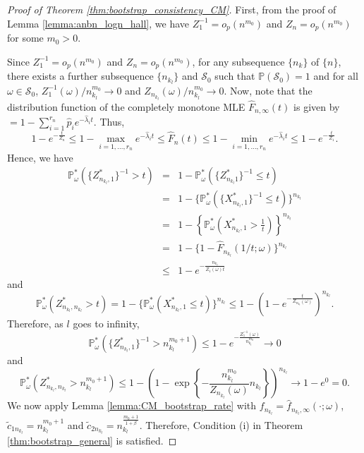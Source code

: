 \documentclass[12pt,letterpaper, twoside, openany]{article}
\theoremstyle{plain}
\begin{document}
\begin{proof}[Proof of Theorem \ref{thm:bootstrap_consistency_CM}]
First, from the proof of Lemma \ref{lemma:anbn_logn_hall}, we have $Z_1^{-1} = o_p(n^{m_0})$ and $Z_n = o_p(n^{m_0})$ for some $m_0 > 0$.

Since $Z^{-1}_1 = o_p(n^{m_0})$ and $Z_n = o_p(n^{m_0})$, for any subsequence $\{n_k\}$ of $\{n\}$, there exists a further subsequence $\{n_{k_l}\}$ and $\mathcal{S}_0$ such that $\mathbb{P}(\mathcal{S}_0) = 1$ and for all $\omega \in \mathcal{S}_0$, $Z^{-1}_1(\omega)/n^{m_0}_{k_l} \rightarrow 0$ and $Z_{n_{k_l}}(\omega)/n^{m_0}_{k_l} \rightarrow 0$. Now, note that the distribution function of the completely monotone MLE $\hat{F}_{n,\infty}(t)$ is given by $ = 1 - \sum^{r_n}_{i=1} \hat{p}_i e^{-\hat{\lambda}_i t}$. Thus,
\begin{equation*}
	1 - e^{-\frac{t}{Z_n}} \leq 1 - \max_{i=1,\ldots,r_n} e^{-\hat{\lambda}_i t} \leq \hat{F}_n(t) \leq 1 -  \min_{i=1,\ldots,r_n} e^{-\hat{\lambda}_i t} \leq 1 - e^{-\frac{t}{Z_1}}.
\end{equation*}
Hence, we have
\begin{eqnarray*}
	\mathbb{P}^*_{\omega}( \{Z^*_{n_{k_l},1}\}^{-1} > t) &=& 1 - \mathbb{P}^*_\omega( \{Z^*_{n_{k_l}1}\}^{-1} \leq t) \\
	&=& 1 - \{\mathbb{P}^*_\omega( \{X^*_{n_{k_l},1}\}^{-1} \leq t) \}^{n_{k_l}} \\
	&=& 1 - \left \{\mathbb{P}^*_\omega \left(X^*_{n_{k_l},1}  > \frac{1}{t} \right) \right \}^{n_{k_l}} \\
	&=& 1 - \{1 - \hat{F}_{n_{k_l}}(1/t; \omega)\}^{n_{k_l}} \\
	& \leq & 1 - e^{- \frac{n_{k_l}}{Z_1(\omega) t}}
\end{eqnarray*}
and
\begin{equation*}
	\mathbb{P}^*_\omega \left(Z^*_{n_{k_l},n_{k_l}} > t\right) =  1 - \{\mathbb{P}^*_\omega(X^*_{n_{k_l},1} \leq t) \}^{n_{k_l}} \leq 1 - \left(1 - e^{-\frac{t}{Z_{n_{k_l}}(\omega)}}\right)^{n_{k_l}}.
\end{equation*}
Therefore, as $l$ goes to infinity,
\begin{equation*}
	\mathbb{P}^*_{\omega}(\{Z^*_{n_{k_l}, 1}\}^{-1} > n^{m_0 + 1}_{k_l}) \leq 1 - e^{- \frac{Z^{-1}_1(\omega)}{n^{m_0}_{k_l}} } \rightarrow 0
\end{equation*}
and
\begin{equation*}
	\mathbb{P}^*_\omega(Z^*_{n_{k_l}, n_{k_l}} > n^{m_0 + 1}_{k_l}) \leq 1 - \left(1 - \exp \left\{- \frac{n^{m_0}_{k_l}}{Z_{n_{k_l}}(\omega)} n_{k_l} \right\} \right)^{n_{k_l}}
	\rightarrow 1 - e^0 = 0.
\end{equation*}
We now apply Lemma \ref{lemma:CM_bootstrap_rate} with $f_{n_{k_l}} = \hat{f}_{n_{k_l}, \infty}(\cdot; \omega)$, $\tilde{c}_{1n_{k_l}} = n^{m_0+1}_{k_l}$ and $\tilde{c}_{2n_{k_l}} = n^{\frac{m_0+1}{1+\beta}}_{k_l}$. Therefore, Condition (i) in Theorem \ref{thm:bootstrap_general} is satisfied.



\end{proof}
\end{document}
